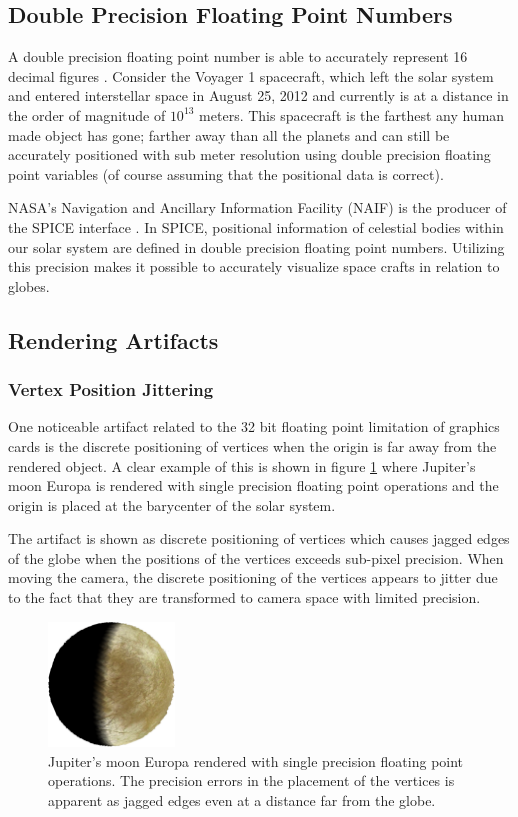 \subsection{Double Precision Floating Point Numbers}

A double precision floating point number is able to accurately represent 16 decimal figures \cite{cozzi11}. Consider the Voyager 1 spacecraft, which left the solar system and entered interstellar space in August 25, 2012 and currently is at a distance in the order of magnitude of $10^{13}$ meters. This spacecraft is the farthest any human made object has gone; farther away than all the planets and can still be accurately positioned with sub meter resolution using double precision floating point variables (of course assuming that the positional data is correct).

NASA's Navigation and Ancillary Information Facility (NAIF) is the producer of the SPICE interface \cite{spice}. In SPICE, positional information of celestial bodies within our solar system are defined in double precision floating point numbers. Utilizing this precision makes it possible to accurately visualize space crafts in relation to globes.

\subsection{Rendering Artifacts}
\subsubsection{Vertex Position Jittering}

One noticeable artifact related to the 32 bit floating point limitation of graphics cards is the discrete positioning of vertices when the origin is far away from the rendered object. A clear example of this is shown in figure \ref{fig:jittering} where Jupiter's moon Europa is rendered with single precision floating point operations and the origin is placed at the barycenter of the solar system.

The artifact is shown as discrete positioning of vertices which causes jagged edges of the globe when the positions of the vertices exceeds sub-pixel precision. When moving the camera, the discrete positioning of the vertices appears to jitter due to the fact that they are transformed to camera space with limited precision.

\begin{figure}[htbp]
    \centering
    \includegraphics[width=0.3\textwidth]{figures/europa.png}
    \caption{Jupiter's moon Europa rendered with single precision floating point operations. The precision errors in the placement of the vertices is apparent as jagged edges even at a distance far from the globe.}
    \label{fig:jittering}
\end{figure}

